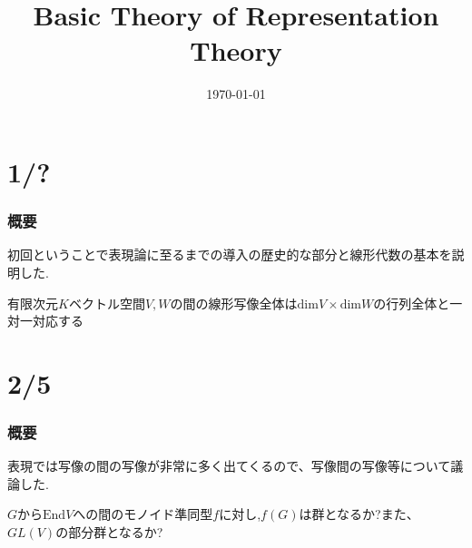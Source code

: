 \documentclass{ujarticle}
\title{Basic Theory of Representation Theory}
\date{\today}
\begin{document}
\maketitle
\tableofcontents
\part{1/?}
\section{概要}
初回ということで表現論に至るまでの導入の歴史的な部分と線形代数の基本を説明した.

\begin{thm}
有限次元$K$ベクトル空間$V,W$の間の線形写像全体は$\mathrm{dim}V \times \mathrm{dim}W$の行列全体と一対一対応する
\end{thm}
\part{2/5}
\setcounter{section}{0}
\section{概要}
表現では写像の間の写像が非常に多く出てくるので、写像間の写像等について議論した.

\begin{prob}
$G$から$\mathrm{End}V$への間のモノイド準同型$f$に対し,$f(G)$は群となるか?また、$GL(V)$の部分群となるか?
\end{prob}
\end{document}
